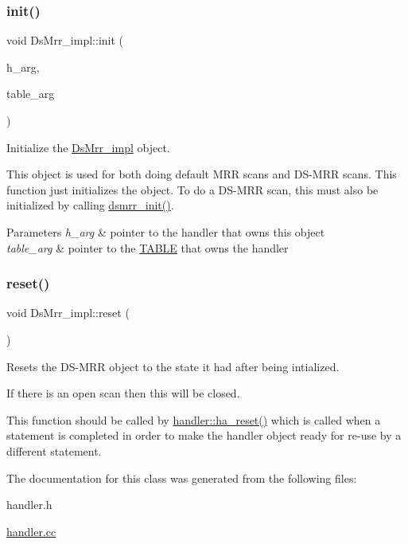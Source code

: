 \subsubsection{\texorpdfstring{init()}{init()}}
{\footnotesize\ttfamily void Ds\+Mrr\+\_\+impl\+::init (\begin{DoxyParamCaption}\item[{\mbox{\hyperlink{classhandler}{handler}} $\ast$}]{h\+\_\+arg,  }\item[{\mbox{\hyperlink{structTABLE}{T\+A\+B\+LE}} $\ast$}]{table\+\_\+arg }\end{DoxyParamCaption})\hspace{0.3cm}{\ttfamily [inline]}}

Initialize the \mbox{\hyperlink{classDsMrr__impl}{Ds\+Mrr\+\_\+impl}} object.

This object is used for both doing default M\+RR scans and DS-\/M\+RR scans. This function just initializes the object. To do a DS-\/M\+RR scan, this must also be initialized by calling \mbox{\hyperlink{classDsMrr__impl_ade7283d68a19de82fd19ad836ac10506}{dsmrr\+\_\+init()}}.


\begin{DoxyParams}{Parameters}
{\em h\+\_\+arg} & pointer to the handler that owns this object \\
\hline
{\em table\+\_\+arg} & pointer to the \mbox{\hyperlink{structTABLE}{T\+A\+B\+LE}} that owns the handler \\
\hline
\end{DoxyParams}
\mbox{\label{classDsMrr__impl_a186174fdee0ea701012e58c55a1e5618}} 
\subsubsection{\texorpdfstring{reset()}{reset()}}
{\footnotesize\ttfamily void Ds\+Mrr\+\_\+impl\+::reset (\begin{DoxyParamCaption}\item[{void}]{ }\end{DoxyParamCaption})}

Resets the DS-\/M\+RR object to the state it had after being intialized.

If there is an open scan then this will be closed.

This function should be called by \mbox{\hyperlink{classhandler_a53d38f167906d8aaa9e560c71e595a42}{handler\+::ha\+\_\+reset()}} which is called when a statement is completed in order to make the handler object ready for re-\/use by a different statement. 

The documentation for this class was generated from the following files\+:\begin{DoxyCompactItemize}
\item 
handler.\+h\item 
\mbox{\hyperlink{handler_8cc}{handler.\+cc}}\end{DoxyCompactItemize}

